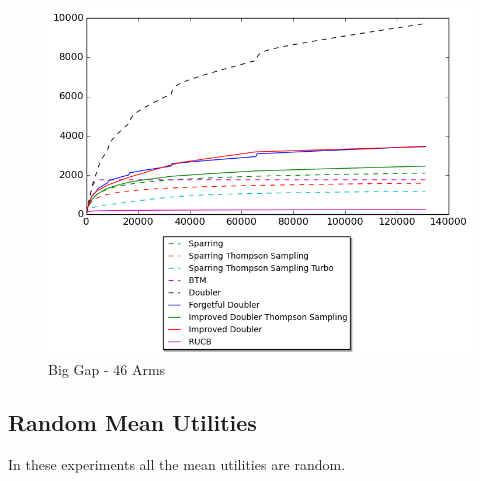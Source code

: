 \documentclass[MSc,beforeExam]{iitcsthesis}
\begin{document}
\newpage
\begin{figure}[h!]
\centering
  \includegraphics[scale=0.8]{graphs/one_strong_arm_46.png}
  \caption{Big Gap - 46 Arms}
\end{figure}
\newpage
\subsection{Random Mean Utilities}
In these experiments all the mean utilities are random.
\end{document}
